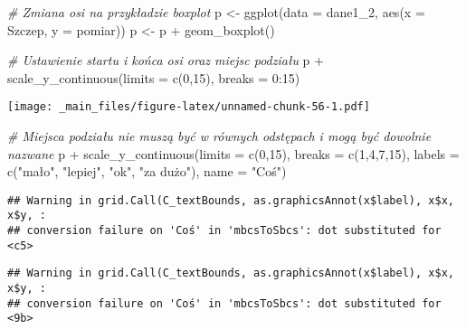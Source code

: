 \documentclass[
]{book}
\newenvironment{Shaded}{\begin{snugshade}}{\end{snugshade}}
\newcommand{\AttributeTok}[1]{\textcolor[rgb]{0.77,0.63,0.00}{#1}}
\newcommand{\CommentTok}[1]{\textcolor[rgb]{0.56,0.35,0.01}{\textit{#1}}}
\newcommand{\DecValTok}[1]{\textcolor[rgb]{0.00,0.00,0.81}{#1}}
\newcommand{\FunctionTok}[1]{\textcolor[rgb]{0.00,0.00,0.00}{#1}}
\newcommand{\NormalTok}[1]{#1}
\newcommand{\OtherTok}[1]{\textcolor[rgb]{0.56,0.35,0.01}{#1}}
\newcommand{\SpecialCharTok}[1]{\textcolor[rgb]{0.00,0.00,0.00}{#1}}
\newcommand{\StringTok}[1]{\textcolor[rgb]{0.31,0.60,0.02}{#1}}
\begin{document}
\begin{Shaded}
\begin{Highlighting}[]
\CommentTok{\# Zmiana osi na przykładzie boxplot}
\NormalTok{p }\OtherTok{\textless{}{-}} \FunctionTok{ggplot}\NormalTok{(}\AttributeTok{data =}\NormalTok{ dane1\_2, }\FunctionTok{aes}\NormalTok{(}\AttributeTok{x =}\NormalTok{ Szczep, }\AttributeTok{y =}\NormalTok{ pomiar))}
\NormalTok{p }\OtherTok{\textless{}{-}}\NormalTok{ p }\SpecialCharTok{+} \FunctionTok{geom\_boxplot}\NormalTok{()}

\CommentTok{\# Ustawienie startu i końca osi oraz miejsc podziału}
\NormalTok{p }\SpecialCharTok{+} \FunctionTok{scale\_y\_continuous}\NormalTok{(}\AttributeTok{limits =} \FunctionTok{c}\NormalTok{(}\DecValTok{0}\NormalTok{,}\DecValTok{15}\NormalTok{), }\AttributeTok{breaks =} \DecValTok{0}\SpecialCharTok{:}\DecValTok{15}\NormalTok{)}
\end{Highlighting}
\end{Shaded}

\texttt{[image: \_main\_files/figure-latex/unnamed-chunk-56-1.pdf]}

\begin{Shaded}
\begin{Highlighting}[]
\CommentTok{\# Miejsca podziału nie muszą być w równych odstępach i mogą być dowolnie nazwane}
\NormalTok{p }\SpecialCharTok{+} \FunctionTok{scale\_y\_continuous}\NormalTok{(}\AttributeTok{limits =} \FunctionTok{c}\NormalTok{(}\DecValTok{0}\NormalTok{,}\DecValTok{15}\NormalTok{), }\AttributeTok{breaks =} \FunctionTok{c}\NormalTok{(}\DecValTok{1}\NormalTok{,}\DecValTok{4}\NormalTok{,}\DecValTok{7}\NormalTok{,}\DecValTok{15}\NormalTok{), }
                       \AttributeTok{labels =} \FunctionTok{c}\NormalTok{(}\StringTok{"mało"}\NormalTok{, }\StringTok{"lepiej"}\NormalTok{, }\StringTok{"ok"}\NormalTok{, }\StringTok{"za dużo"}\NormalTok{), }
                       \AttributeTok{name =} \StringTok{"Coś"}\NormalTok{)}
\end{Highlighting}
\end{Shaded}

\begin{verbatim}
## Warning in grid.Call(C_textBounds, as.graphicsAnnot(x$label), x$x, x$y, :
## conversion failure on 'Coś' in 'mbcsToSbcs': dot substituted for <c5>
\end{verbatim}

\begin{verbatim}
## Warning in grid.Call(C_textBounds, as.graphicsAnnot(x$label), x$x, x$y, :
## conversion failure on 'Coś' in 'mbcsToSbcs': dot substituted for <9b>
\end{verbatim}
\end{document}
